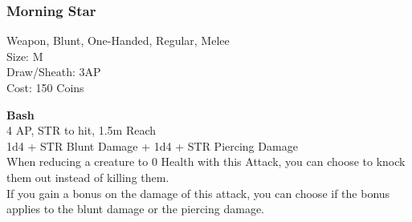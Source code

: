 \subsubsection{Morning Star}\label{weapon:morningStar}
Weapon, Blunt, One-Handed, Regular, Melee\\
Size: M\\
Draw/Sheath: 3AP\\
Cost: 150 Coins

\textbf{Bash}\\
4 AP, STR to hit, 1.5m Reach\\
1d4 + \texttimes STR Blunt Damage + 1d4 + \texttimes STR Piercing Damage\\
When reducing a creature to 0 Health with this Attack, you can choose to knock them out instead of killing them.\\
If you gain a bonus on the damage of this attack, you can choose if the bonus applies to the blunt damage or the piercing damage.